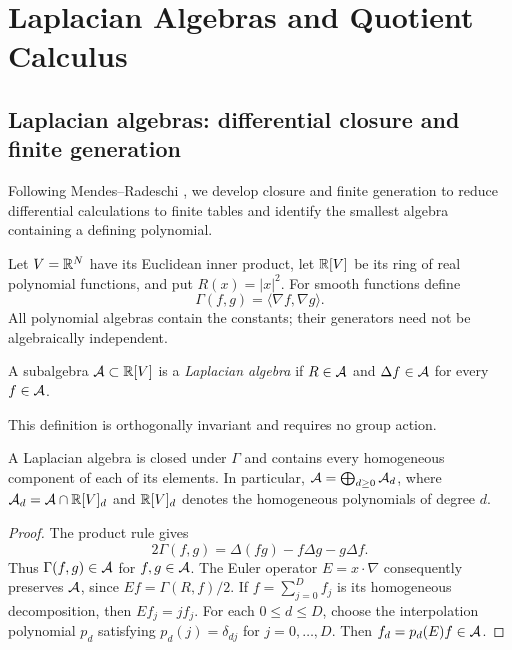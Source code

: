\section{Laplacian Algebras and Quotient Calculus}
\label{sec:laplacian-calculus}

\subsection{Laplacian algebras: differential closure and finite generation}
\label{sec:laplacian-foundations}

Following Mendes--Radeschi \cite[Section~5]{MendesRadeschi}, we develop
closure and finite generation to reduce differential calculations to
finite tables and identify the smallest algebra containing a defining polynomial.

Let \(V=\mathbb R^N\) have its Euclidean inner product, let \(\mathbb R[V]\) be its
ring of real polynomial functions, and put \(R(x)=|x|^2\).
For smooth functions define
\[
 \Gamma(f,g)=\langle\nabla f,\nabla g\rangle.
\]
All polynomial algebras contain the constants; their generators need
not be algebraically independent.

\begin{definition}
\label{def:laplacian-algebra}
A subalgebra \(\mathcal A\subset\mathbb R[V]\) is a \emph{Laplacian algebra} if
\(R\in\mathcal A\) and \(\Delta f\in\mathcal A\) for every \(f\in\mathcal A\).
\end{definition}

This definition is orthogonally invariant and requires no group action.

\begin{lemma}
\label{lem:laplacian-grading}
A Laplacian algebra is closed under \(\Gamma\) and contains every
homogeneous component of each of its elements. In particular,
\(\mathcal A=\bigoplus_{d\geq0}\mathcal A_d\), where
\(\mathcal A_d=\mathcal A\cap\mathbb R[V]_d\) and \(\mathbb R[V]_d\) denotes the homogeneous
polynomials of degree \(d\).
\end{lemma}

\begin{proof}
The product rule gives
\begin{equation}\label{eq:Gamma-polarization}
 2\Gamma(f,g)=\Delta(fg)-f\Delta g-g\Delta f.
\end{equation}
Thus \(\Gamma(f,g)\in\mathcal A\) for \(f,g\in\mathcal A\). The Euler operator
\(E=x\cdot\nabla\) consequently preserves \(\mathcal A\), since
\(Ef=\Gamma(R,f)/2\). If \(f=\sum_{j=0}^D f_j\) is its homogeneous
decomposition, then \(Ef_j=jf_j\). For each \(0\leq d\leq D\), choose
the interpolation polynomial \(p_d\) satisfying
\(p_d(j)=\delta_{dj}\) for \(j=0,\ldots,D\). Then
\(f_d=p_d(E)f\in\mathcal A\).
\end{proof}

